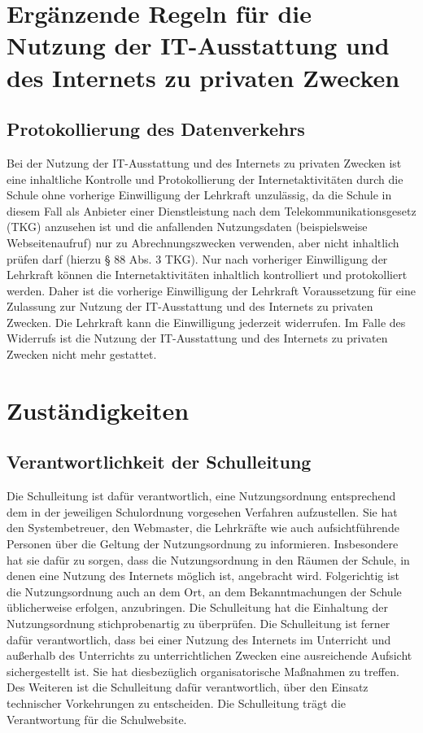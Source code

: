 \documentclass[a4paper, parskip]{scrartcl}
\begin{document}
\section{Ergänzende Regeln für die Nutzung der IT-Ausstattung und des
Internets zu privaten Zwecken}
\subsection{Protokollierung des Datenverkehrs}
Bei der Nutzung der IT-Ausstattung und des Internets zu privaten Zwecken ist
eine inhaltliche Kontrolle und Protokollierung der Internetaktivitäten durch
die Schule ohne vorherige Einwilligung der Lehrkraft unzulässig, da die Schule
in diesem Fall als Anbieter einer Dienstleistung nach dem
Telekommunikationsgesetz (TKG) anzusehen ist und die anfallenden Nutzungsdaten
(beispielsweise Webseitenaufruf) nur zu Abrechnungszwecken verwenden, aber
nicht inhaltlich prüfen darf (hierzu § 88 Abs. 3 TKG). Nur nach vorheriger
Einwilligung der Lehrkraft können die Internetaktivitäten inhaltlich
kontrolliert und protokolliert werden. Daher ist die vorherige Einwilligung
der Lehrkraft Voraussetzung für eine Zulassung zur Nutzung der IT-Ausstattung
und des Internets zu privaten Zwecken.
Die Lehrkraft kann die Einwilligung jederzeit widerrufen. Im Falle des
Widerrufs ist die Nutzung der IT-Ausstattung und des Internets zu privaten
Zwecken nicht mehr gestattet.

\section{Zuständigkeiten}
\subsection{Verantwortlichkeit der Schulleitung}
Die Schulleitung ist dafür verantwortlich, eine Nutzungsordnung entsprechend
dem in der jeweiligen Schulordnung vorgesehen Verfahren aufzustellen. Sie hat
den Systembetreuer, den Webmaster, die Lehrkräfte wie auch aufsichtführende
Personen über die Geltung der Nutzungsordnung zu informieren. Insbesondere hat
sie dafür zu sorgen, dass die Nutzungsordnung in den Räumen der Schule, in
denen eine Nutzung des Internets möglich ist, angebracht wird. Folgerichtig ist
die Nutzungsordnung auch an dem Ort, an dem Bekanntmachungen der Schule
üblicherweise erfolgen, anzubringen. Die Schulleitung hat die Einhaltung der
Nutzungsordnung stichprobenartig zu überprüfen. Die Schulleitung ist ferner
dafür verantwortlich, dass bei einer Nutzung des Internets im Unterricht und
außerhalb des Unterrichts zu unterrichtlichen Zwecken eine ausreichende
Aufsicht sichergestellt ist. Sie hat diesbezüglich organisatorische Maßnahmen
zu treffen. Des Weiteren ist die Schulleitung dafür verantwortlich, über den
Einsatz technischer Vorkehrungen zu entscheiden.
Die Schulleitung trägt die Verantwortung für die Schulwebsite.
\end{document}
